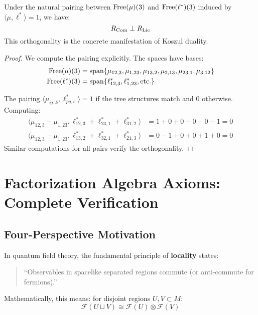 \begin{example}
\begin{proposition}[Orthogonality]\label{prop:orthogonal}
Under the natural pairing between $\operatorname{Free}(\mu)(3)$ and $\operatorname{Free}(\ell^*)(3)$ induced by $\langle \mu, \ell^* \rangle = 1$, we have:
\[
R_{\operatorname{Com}} \perp R_{\operatorname{Lie}}
\]
This orthogonality is the concrete manifestation of Koszul duality.
\end{proposition}
 
\begin{proof}
We compute the pairing explicitly. The spaces have bases:
\begin{align}
\operatorname{Free}(\mu)(3) &= \text{span}\{\mu_{12,3}, \mu_{1,23}, \mu_{13,2}, \mu_{2,13}, \mu_{23,1}, \mu_{3,12}\} \\
\operatorname{Free}(\ell^*)(3) &= \text{span}\{\ell^*_{12,3}, \ell^*_{1,23}, \text{etc.}\}
\end{align}
 
The pairing $\langle \mu_{ij,k}, \ell^*_{pq,r} \rangle = 1$ if the tree structures match and $0$ otherwise. Computing:
\begin{align}
\langle \mu_{12,3} - \mu_{1,23}, \ell^*_{12,3} + \ell^*_{23,1} + \ell^*_{31,2} \rangle &= 1 + 0 + 0 - 0 - 0 - 1 = 0 \\
\langle \mu_{12,3} - \mu_{1,23}, \ell^*_{13,2} + \ell^*_{32,1} + \ell^*_{21,3} \rangle &= 0 - 1 + 0 + 0 + 1 + 0 = 0
\end{align}
Similar computations for all pairs verify the orthogonality.
\end{proof}

\section{Factorization Algebra Axioms: Complete Verification}
\label{sec:factorization-axioms-complete}

\subsection{Four-Perspective Motivation}

\begin{motivation}
In quantum field theory, the fundamental principle of \textbf{locality} states:
\begin{quote}
``Observables in spacelike separated regions commute (or anti-commute for fermions).''
\end{quote}

Mathematically, this means: for disjoint regions $U, V \subset M$:
$$\mathcal{F}(U \sqcup V) \cong \mathcal{F}(U) \otimes \mathcal{F}(V)$$


\end{motivation}
\end{example}
